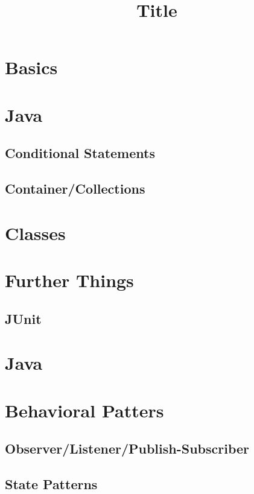 \documentclass[
    fourColumns,
    landscape,
]{formularyETH/formularyETH}
\title{Title}
\begin{document}
  
  
\section{Basics}
  
  \newpage
\section{Java}

  
  \subsection{Conditional Statements}
  
  \subsection{Container/Collections}
  
\section{Classes}
  
\section*{Further Things}
\subsection{JUnit}
\newpage
\section{Java}
  
\newpage
\section{Behavioral Patters}
\label{subsubsec:Behavirol}

\subsection{Observer\slash Listener\slash Publish-Subscriber}
\label{subsubsec:Observer}

\subsection{State Patterns}
\label{subsubsec:StatePatterns}

\end{document}
